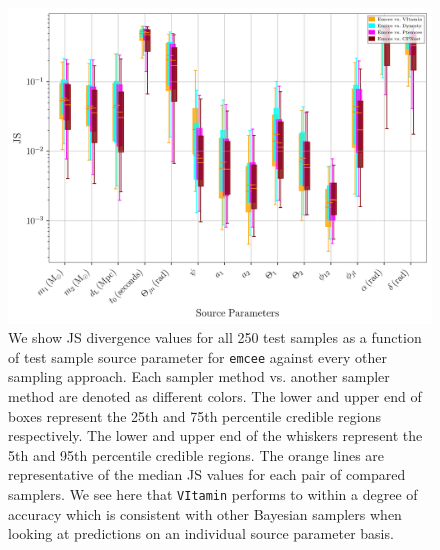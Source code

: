 \begin{figure}
    \includegraphics[width=\columnwidth]{figures/JS_IndiPar_emcee.png}
    \caption[JS divergences of individual source parameters for \texttt{Emcee} against all other approaches.]{\label{fig:JS_indi_par_emcee} We show JS divergence values for all 250 test samples as a function of test sample source parameter for \texttt{emcee} against every other sampling approach. Each sampler method vs. another sampler method are denoted as different colors. The lower and upper end of boxes represent the 25th and 75th percentile credible regions respectively. The lower and upper end of the whiskers represent the 5th and 95th percentile credible regions. The orange lines are representative of the median JS values for each pair of compared samplers. We see here that \texttt{VItamin} performs to within a degree of accuracy which is consistent with other Bayesian samplers when looking at predictions on an individual source parameter basis.}
\end{figure}

%
%


